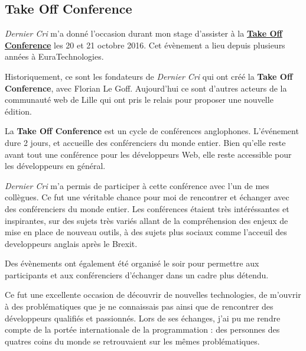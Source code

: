 \bigskip

\subsection{Take Off Conference}\label{take-off-conference}

\bigskip

\emph{Dernier Cri} m'a donné l'occasion durant mon stage d'assister à la
\href{http://takeoffconf.com/2016}{\textbf{Take Off Conference}} les 20
et 21 octobre 2016. Cet évènement a lieu depuis plusieurs années à
EuraTechnologies.

\bigskip

Historiquement, ce sont les fondateurs de \emph{Dernier Cri} qui ont
créé la \textbf{Take Off Conference}, avec Florian Le Goff. Aujourd'hui
ce sont d'autres acteurs de la communauté web de Lille qui ont pris le
relais pour proposer une nouvelle édition.

\bigskip

La \textbf{Take Off Conference} est un cycle de conférences anglophones.
L'événement dure 2 jours, et accueille des conférenciers du monde
entier. Bien qu'elle reste avant tout une conférence pour les
développeurs Web, elle reste accessible pour les développeurs en
général.

\bigskip

\emph{Dernier Cri} m'a permis de participer à cette conférence avec l'un
de mes collègues. Ce fut une véritable chance pour moi de rencontrer et
échanger avec des conférenciers du monde entier. Les conférences étaient
très intéréssantes et inspirantes, sur des sujets très variés allant de
la compréhension des enjeux de mise en place de nouveau outils, à des
sujets plus sociaux comme l'acceuil des developpeurs anglais après le
Brexit.

\bigskip

Des évènements ont également été organisé le soir pour permettre aux
participants et aux conférenciers d'échanger dans un cadre plus détendu.

\bigskip

Ce fut une excellente occasion de découvrir de nouvelles technologies,
de m'ouvrir à des problématiques que je ne connaissais pas ainsi que de
rencontrer des développeurs qualifiés et passionnés. Lors de ses
échanges, j'ai pu me rendre compte de la portée internationale de la
programmation : des personnes des quatres coins du monde se retrouvaient
sur les mêmes problématiques.

\bigskip

